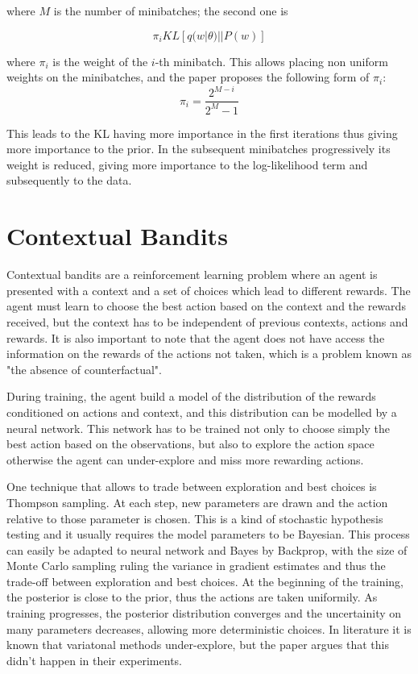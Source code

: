 \documentclass{article}
\begin{document}
where $M$ is the number of minibatches; the second one is

\[
    \pi_i KL[q(w | \theta) || P(w)]
\]

where $\pi_i$ is the weight of the $i$-th minibatch. This allows placing non uniform weights on the minibatches, and the paper proposes the following form of $\pi_i$:
\[
    \pi_i = \frac{2^{M-i}}{2^M-1}
\]

This leads to the KL having more importance in the first iterations thus giving more importance to the prior. In the subsequent minibatches progressively its weight is reduced, giving more importance to the log-likelihood term and subsequently to the data.

\section{Contextual Bandits}

Contextual bandits are a reinforcement learning problem where an agent is presented with a context and a set of choices which lead to different rewards. The agent must learn to choose the best action based on the context and the rewards received, but the context has to be independent of previous contexts, actions and rewards. It is also important to note that the agent does not have access the information on the rewards of the actions not taken, which is a problem known as "the absence of counterfactual".

During training, the agent build a model of the distribution of the rewards conditioned on actions and context, and this distribution can be modelled by a neural network. This network has to be trained not only to choose simply the best action based on the observations, but also to explore the action space otherwise the agent can under-explore and miss more rewarding actions.

One technique that allows to trade between exploration and best choices is Thompson sampling. At each step, new parameters are drawn and the action relative to those parameter is chosen. This is a kind of stochastic hypothesis testing and it usually requires the model parameters to be Bayesian. This process can easily be adapted to neural network and Bayes by Backprop, with the size of Monte Carlo sampling ruling the variance in gradient estimates and thus the trade-off between exploration and best choices. At the beginning of the training, the posterior is close to the prior, thus the actions are taken uniformily. As training progresses, the posterior distribution converges and the uncertainity on many parameters decreases, allowing more deterministic choices. In literature it is known that variatonal methods under-explore, but the paper argues that this didn't happen in their experiments.
\end{document}
